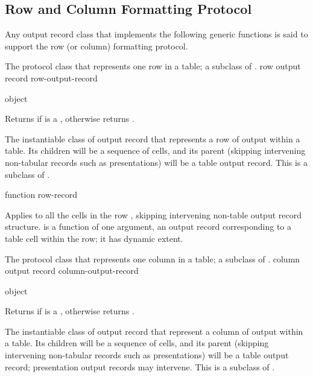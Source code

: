 \subsection {Row and Column Formatting Protocol}

Any output record class that implements the following generic functions is said
to support the row (or column) formatting protocol.


The protocol class that represents one row in a table; a subclass of
.
 {row output record} {row-output-record}

 {object}

Returns  if  is a , otherwise
returns .


The instantiable class of output record that represents a row of output within a
table.  Its children will be a sequence of cells, and its parent (skipping
intervening non-tabular records such as presentations) will be a table output
record.  This is a subclass of .

 {function row-record}

Applies  to all the cells in the row , skipping
intervening non-table output record structure.   is a function of
one argument, an output record corresponding to a table cell within the row; it
has dynamic extent.



The protocol class that represents one column in a table; a subclass of
.
 {column output record} {column-output-record}

 {object}

Returns  if  is a , otherwise
returns .


The instantiable class of output record that represent a column of output within
a table.  Its children will be a sequence of cells, and its parent (skipping
intervening non-tabular records such as presentations) will be a table output
record; presentation output records may intervene.  This is a subclass of
.

